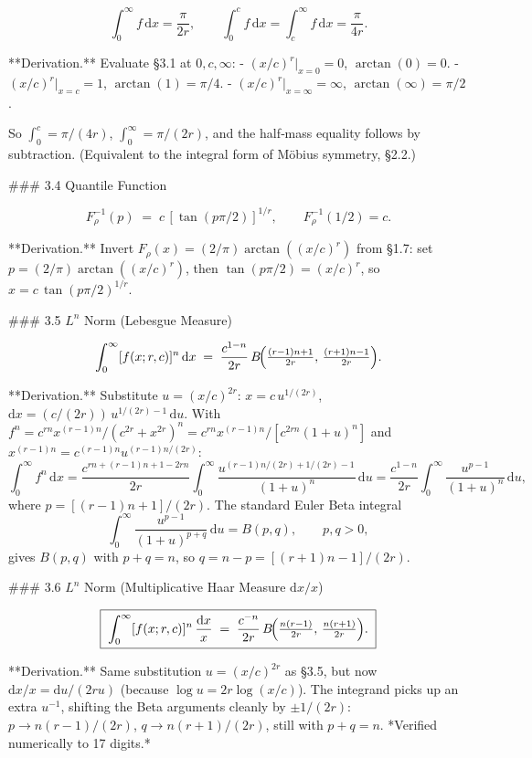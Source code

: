 $$
\int_{0}^{\infty}f\,\mathrm dx = \frac{\pi}{2r},\qquad \int_{0}^{c}f\,\mathrm dx = \int_{c}^{\infty}f\,\mathrm dx = \frac{\pi}{4r}.
$$

**Derivation.** Evaluate §3.1 at $0,c,\infty$:
- $(x/c)^{r}|_{x=0}=0$, $\arctan(0)=0$.
- $(x/c)^{r}|_{x=c}=1$, $\arctan(1)=\pi/4$.
- $(x/c)^{r}|_{x=\infty}=\infty$, $\arctan(\infty)=\pi/2$.

So $\int_{0}^{c}=\pi/(4r)$, $\int_{0}^{\infty}=\pi/(2r)$, and the half‑mass equality follows by subtraction. (Equivalent to the integral form of Möbius symmetry, §2.2.)

### 3.4 Quantile Function

$$
F_{\rho}^{-1}(p) \;=\; c\,[\tan(p\pi/2)]^{1/r},\qquad F_{\rho}^{-1}(1/2) = c.
$$

**Derivation.** Invert $F_{\rho}(x) = (2/\pi)\arctan((x/c)^{r})$ from §1.7: set $p = (2/\pi)\arctan((x/c)^{r})$, then $\tan(p\pi/2) = (x/c)^{r}$, so $x = c\,\tan(p\pi/2)^{1/r}$.

### 3.5 $L^{n}$ Norm (Lebesgue Measure)

$$
\int_{0}^{\infty}[f(x;r,c)]^{n}\,\mathrm dx \;=\; \frac{c^{1-n}}{2r}\,B\!\Bigl(\tfrac{(r-1)n+1}{2r},\,\tfrac{(r+1)n-1}{2r}\Bigr).
$$

**Derivation.** Substitute $u = (x/c)^{2r}$: $x = c\,u^{1/(2r)}$, $\mathrm dx = (c/(2r))\,u^{1/(2r)-1}\,\mathrm du$. With $f^{n} = c^{rn}x^{(r-1)n}/(c^{2r}+x^{2r})^{n} = c^{rn}x^{(r-1)n}/[c^{2rn}(1+u)^{n}]$ and $x^{(r-1)n} = c^{(r-1)n}u^{(r-1)n/(2r)}$:
$$
\int_{0}^{\infty}f^{n}\,\mathrm dx = \frac{c^{rn+(r-1)n+1-2rn}}{2r}\int_{0}^{\infty}\frac{u^{(r-1)n/(2r)+1/(2r)-1}}{(1+u)^{n}}\,\mathrm du = \frac{c^{1-n}}{2r}\int_{0}^{\infty}\frac{u^{p-1}}{(1+u)^{n}}\,\mathrm du,
$$
where $p = [(r-1)n+1]/(2r)$. The standard Euler Beta integral
$$
\int_{0}^{\infty}\frac{u^{p-1}}{(1+u)^{p+q}}\,\mathrm du = B(p,q),\qquad p,q>0,
$$
gives $B(p,q)$ with $p+q = n$, so $q = n-p = [(r+1)n-1]/(2r)$.

### 3.6 $L^{n}$ Norm (Multiplicative Haar Measure $\mathrm dx/x$)

$$
\boxed{\;\int_{0}^{\infty}[f(x;r,c)]^{n}\,\frac{\mathrm dx}{x} \;=\; \frac{c^{-n}}{2r}\,B\!\Bigl(\tfrac{n(r-1)}{2r},\,\tfrac{n(r+1)}{2r}\Bigr).\;}
$$

**Derivation.** Same substitution $u = (x/c)^{2r}$ as §3.5, but now $\mathrm dx/x = \mathrm du/(2ru)$ (because $\log u = 2r\log(x/c)$). The integrand picks up an extra $u^{-1}$, shifting the Beta arguments cleanly by $\pm 1/(2r)$: $p\to n(r-1)/(2r)$, $q\to n(r+1)/(2r)$, still with $p+q = n$. *Verified numerically to 17 digits.*

